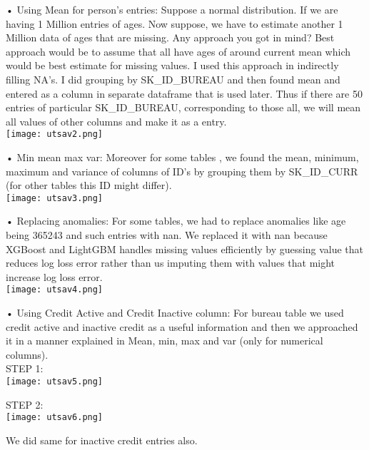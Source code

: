 \documentclass[fleqn,10pt]{SelfArx} %
\begin{document}
\begin{itemize}
\noindent
•	Using Mean for person’s entries: Suppose a normal distribution. If we are having 1 Million entries of ages. Now suppose, we have to estimate another 1 Million data of ages that are missing. Any approach you got in mind? Best approach would be to assume that all have ages of around current mean which would be best estimate for missing values. I used this approach in indirectly filling NA’s. I did grouping by SK_ID_BUREAU and then found mean and entered as a column in separate dataframe that is used later. Thus if there are 50 entries of particular SK_ID_BUREAU, corresponding to those all, we will mean all values of other columns and make it as a entry. \\
\texttt{[image: utsav2.png]}
\label{fig:results}

\noindent
•	Min mean max var: Moreover for some tables , we found the mean, minimum, maximum and variance of columns of ID’s by grouping them by SK_ID_CURR (for other tables this ID might differ).\\

\texttt{[image: utsav3.png]}
\label{fig:results}


\noindent
•	Replacing anomalies: For some tables, we had to replace anomalies like age being 365243 and such entries  with nan. We replaced it with nan because XGBoost and LightGBM handles missing values efficiently by guessing value that reduces log loss error rather than us imputing them with values that might increase log loss error. \\

\texttt{[image: utsav4.png]}
\label{fig:results}

\noindent
•	Using Credit Active and Credit Inactive column: For bureau table we used credit active and inactive credit as a useful information and then we approached it in a manner explained in Mean, min, max and var (only for numerical columns). \\

\noindent
STEP 1:\\
\texttt{[image: utsav5.png]}
\label{fig:results}

\noindent
STEP 2:\\
\texttt{[image: utsav6.png]}
\label{fig:results}

\noindent
We did same for inactive credit entries also.\\


\end{itemize}
\end{document}
